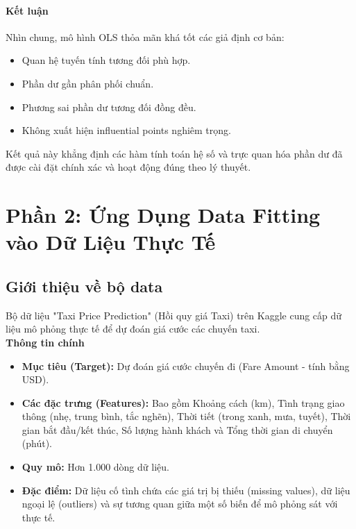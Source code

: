 \paragraph{Kết luận}

Nhìn chung, mô hình OLS thỏa mãn khá tốt các giả định cơ bản:
\begin{itemize}
    \item Quan hệ tuyến tính tương đối phù hợp.
    \item Phần dư gần phân phối chuẩn.
    \item Phương sai phần dư tương đối đồng đều.
    \item Không xuất hiện influential points nghiêm trọng.
\end{itemize}
Kết quả này khẳng định các hàm tính toán hệ số và trực quan hóa phần dư đã được cài đặt chính xác và hoạt động đúng theo lý thuyết.


\section{Phần 2: Ứng Dụng Data Fitting vào Dữ Liệu Thực Tế}
\subsection{Giới thiệu về bộ data}
Bộ dữ liệu "Taxi Price Prediction" (Hồi quy giá Taxi) trên Kaggle cung cấp dữ liệu mô phỏng thực tế để dự đoán giá cước các chuyến taxi.
\\[0.5cm]
\textbf{Thông tin chính}
\begin{itemize}
  \item \textbf{Mục tiêu (Target): } Dự đoán giá cước chuyến đi (Fare Amount - tính bằng USD).
  \item \textbf{Các đặc trưng (Features): } Bao gồm Khoảng cách (km), Tình trạng giao thông (nhẹ, trung bình, tắc nghẽn), Thời tiết (trong xanh, mưa, tuyết), Thời gian bắt đầu/kết thúc, Số lượng hành khách và Tổng thời gian di chuyển (phút).
  \item \textbf{Quy mô: } Hơn 1.000 dòng dữ liệu.
  \item \textbf{Đặc điểm: } Dữ liệu cố tình chứa các giá trị bị thiếu (missing values), dữ liệu ngoại lệ (outliers) và sự tương quan giữa một số biến để mô phỏng sát với thực tế.
\end{itemize}

